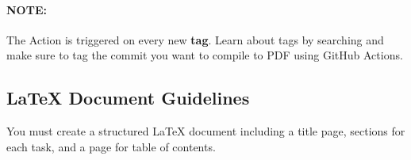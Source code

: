 \documentclass[12pt]{article}
\begin{document}
\paragraph{NOTE:} The Action is triggered on every new \textbf{tag}. Learn about tags by searching and make sure to tag the commit you want to compile to PDF using
GitHub Actions.

\subsection*{LaTeX Document Guidelines}
You must create a structured LaTeX document including a title page, sections for each task, and a page for table of contents.
\end{document}
